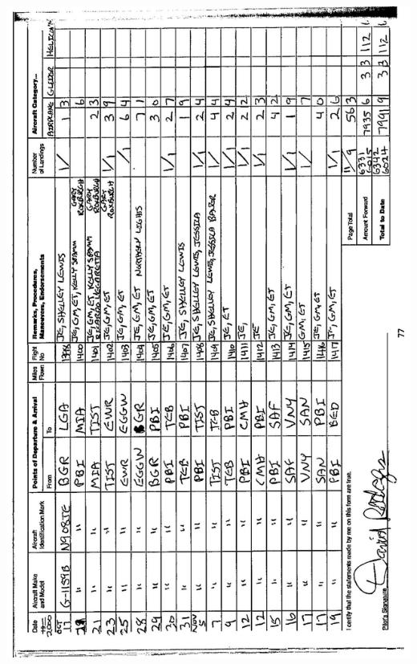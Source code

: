 \documentclass[10pt]{article}
\begin{document}
\includegraphics[max width=\textwidth, center]{2025_02_27_dd68c3d38de88f0516d9g-081}
\end{document}
